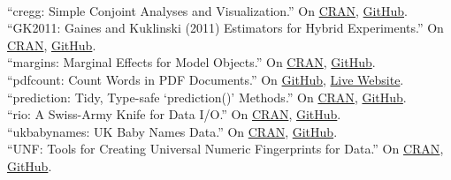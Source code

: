 \documentclass[12pt]{article}
\renewcommand{\section}[1]{\pagebreak[3]%
    \llap{\scshape\smash{\parbox[t]{\marginparwidth}{\raggedright {\color{lg}#1}}}}%
    \vspace{-\baselineskip}\par}
\newcommand{\topic}[1]{\pagebreak[3]\indent {\color{lg}{\footnotesize #1 }}\\}
\newcommand{\entry}[1]{\indent {\color{lg}\guillemotright}\hspace{2pt}#1\vspace{.25em}\\}
\begin{document}
\section{Software}
\topic{R Packages: Actively Maintained}
	\entry{``cregg: Simple Conjoint Analyses and Visualization.'' On \href{https://cran.r-project.org/package=cregg}{CRAN}, \href{https://github.com/leeper/cregg}{GitHub}.}
    \entry{``GK2011: Gaines and Kuklinski (2011) Estimators for Hybrid Experiments.'' On \href{https://cran.r-project.org/package=GK2011}{CRAN}, \href{https://github.com/leeper/GK2011}{GitHub}.}
	\entry{``margins: Marginal Effects for Model Objects.'' On \href{https://cran.r-project.org/package=margins}{CRAN}, \href{https://github.com/leeper/margins}{GitHub}.}
	\entry{``pdfcount: Count Words in PDF Documents.'' On \href{https://github.com/leeper/pdfcount}{GitHub}, \href{https://leeper.shinyapps.io/pdfcount/}{Live Website}.}
	\entry{``prediction: Tidy, Type-safe `prediction()' Methods.'' On \href{https://cran.r-project.org/package=prediction}{CRAN}, \href{https://github.com/leeper/prediction}{GitHub}.}
    \entry{``rio: A Swiss-Army Knife for Data I/O.'' On \href{https://cran.r-project.org/package=rio}{CRAN}, \href{https://github.com/leeper/rio}{GitHub}.}
    \entry{``ukbabynames: UK Baby Names Data.'' On \href{https://cran.r-project.org/package=ukbabynames}{CRAN}, \href{https://github.com/leeper/ukbabynames}{GitHub}.}
	\entry{``UNF: Tools for Creating Universal Numeric Fingerprints for Data.'' On \href{https://cran.r-project.org/package=UNF}{CRAN}, \href{https://github.com/leeper/UNF}{GitHub}.}
\end{document}
